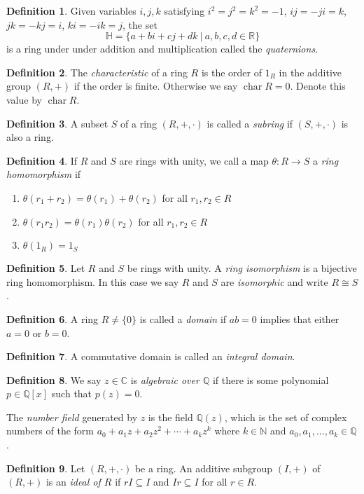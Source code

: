 \documentclass[12pt]{article}
\newcommand{\enumarabic}[1]{
	\begin{enumerate}[label=\textbf{\arabic*.}]
		#1
	\end{enumerate}
}
\theoremstyle{definition}
\newtheorem*{defn}{Definition}
\newcommand{\C}{\mathbb{C}}
\newcommand{\N}{\mathbb{N}}
\newcommand{\Q}{\mathbb{Q}}
\newcommand{\R}{\mathbb{R}}
\begin{document}
\begin{defn}
	Given variables $i,j,k$ satisfying  $i^2=j^2=k^2=-1$, $ij=-ji=k$, $jk=-kj=i$, $ki=-ik=j$, the set
	\[\mathbb{H}=\{a+bi+cj+dk\ |\ a,b,c,d\in\R\}\]
	is a ring under under addition and multiplication called the \emph{quaternions}. 
\end{defn}
\begin{defn}
	The \emph{characteristic} of a ring $R$ is the order of $1_R$ in the additive group $(R,+)$ if the order is finite.  Otherwise we say $\operatorname{char} R=0$.  Denote this value by $\operatorname{char} R$.
\end{defn}
\begin{defn}
	A subset $S$ of a ring $(R,+,\cdot)$ is called a \emph{subring} if $(S,+,\cdot)$ is also a ring.
\end{defn}
\begin{defn}
	If $R$ and $S$ are rings with unity, we call a map $\theta:R\to S$ a \emph{ring homomorphism} if
	\enumarabic{
		\item $\theta(r_1+r_2)=\theta(r_1)+\theta(r_2)$ for all $r_1,r_2\in R$
		\item $\theta(r_1r_2)=\theta(r_1)\theta(r_2)$ for all $r_1,r_2\in R$
		\item $\theta(1_R)=1_S$
	}
\end{defn}
\begin{defn}
	Let $R$ and $S$ be rings with unity. A \emph{ring isomorphism} is a bijective ring homomorphism.
	In this case we say $R$ and $S$ are \emph{isomorphic} and write $R\cong S$.
\end{defn}
\begin{defn}
	A ring $R\neq\{0\}$ is called a \emph{domain} if $ab=0$ implies that either $a=0$ or $b=0$.
\end{defn}
\begin{defn}
	A commutative domain is called an \emph{integral domain}.
\end{defn}
\begin{defn}
	We say $z\in \C$ is \emph{algebraic over $\Q$} if there is some polynomial $p\in \Q[x]$ such that $p(z)=0$.
	
	The \emph{number field} generated by $z$ is the field $\Q(z)$, which is the set of complex numbers of the form $a_0+a_1z+a_2z^2+\cdots+a_k z^k$ where $k\in\N$ and $a_0,a_1,\dots,a_k\in\Q$.
\end{defn}
\begin{defn}
	Let $(R,+,\cdot)$ be a ring. An additive subgroup $(I,+)$ of $(R,+)$ is an \emph{ideal of $R$} if $rI\subseteq I$ and $Ir\subseteq I$ for all $r\in R$.
\end{defn}
\end{document}
